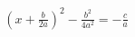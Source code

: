 \documentclass[preview]{standalone}
\begin{document}
\begin{align*}
\left( x + \frac{b}{2a} \right)^2 - \frac{b^2}{4a^2} = -\frac{c}{a}
\end{align*}
\end{document}
